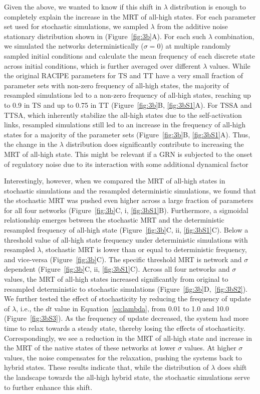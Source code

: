 \documentclass[11pt]{article}
\begin{document}
Given the above, we wanted to know if this shift in $\lambda$ distribution is enough to completely explain the increase in the MRT of all-high states. For each parameter set used for stochastic simulations, we sampled $\lambda$ from the additive noise stationary distribution shown in (Figure~\ref{fig:3b}A). For each such $\lambda$ combination, we simulated the networks deterministically ($\sigma = 0$) at multiple randomly sampled initial conditions and calculate the mean frequency of each discrete state across initial conditions, which is further averaged over different $\lambda$ values. While the original RACIPE parameters for TS and TT have a very small fraction of parameter sets with non-zero frequency of all-high states, the majority of resampled simulations led to a non-zero frequency of all-high states, reaching up to 0.9 in TS and up to 0.75 in TT (Figure~\ref{fig:3b}B, \ref{fig:3bS1}A). For TSSA and TTSA, which inherently stabilize the all-high states due to the self-activation links, resampled simulations still led to an increase in the frequency of all-high states for a majority of the parameter sets (Figure~\ref{fig:3b}B, \ref{fig:3bS1}A). Thus, the change in the $\lambda$ distribution does significantly contribute to increasing the MRT of all-high state. This might be relevant if a GRN is subjected to the onset of regulatory noise due to its interaction with some additional dynamical factor

Interestingly, however, when we compared the MRT of all-high states in stochastic simulations and the resampled deterministic simulations, we found that the stochastic MRT was pushed even higher across a large fraction of parameters for all four networks (Figure~\ref{fig:3b}C, i, \ref{fig:3bS1}B). Furthermore, a sigmoidal relationship emerges between the stochastic MRT and the deterministic resampled frequency of all-high state (Figure~\ref{fig:3b}C, ii, \ref{fig:3bS1}C). Below a threshold value of all-high state frequency under deterministic simulations with resampled $\lambda$, stochastic MRT is lower than or equal to deterministic frequency, and vice-versa (Figure~\ref{fig:3b}C). The specific threshold MRT is network and $\sigma$ dependent (Figure~\ref{fig:3b}C, ii, \ref{fig:3bS1}C). Across all four networks and $\sigma$ values, the MRT of all-high states increased significantly from original to resampled deterministic to stochastic simulations (Figure~\ref{fig:3b}D,~\ref{fig:3bS2}). We further tested the effect of stochasticity by reducing the frequency of update of $\lambda$, i.e., the $dt$ value in Equation~\ref{eq:lambda}, from 0.01 to 1.0 and 10.0 (Figure~\ref{fig:3bS3}). As the frequency of update decreased, the system had more time to relax towards a steady state, thereby losing the effects of stochasticity. Correspondingly, we see a reduction in the MRT of all-high state and increase in the MRT of the native states of these networks at lower $\sigma$ values. At higher $\sigma$ values, the noise compensates for the relaxation, pushing the systems back to hybrid states. These results indicate that, while the distribution of $\lambda$ does shift the landscape towards the all-high hybrid state, the stochastic simulations serve to further enhance this shift. 
\end{document}
